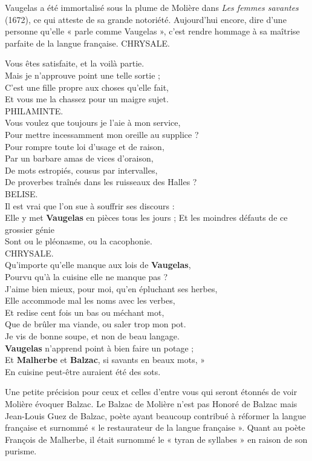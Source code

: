 \begin{bbcomplement}{}
Vaugelas a été immortalisé sous la plume de Molière dans \textit{Les femmes savantes} (1672), ce qui atteste de sa grande notoriété. Aujourd’hui encore, dire d’une personne qu’elle « parle comme Vaugelas », c’est rendre hommage à sa maîtrise parfaite de la langue française.
CHRYSALE.
\par
Vous êtes satisfaite, et la voilà partie.\\
Mais je n’approuve point une telle sortie ;\\
C’est une fille propre aux choses qu’elle fait,\\
Et vous me la chassez pour un maigre sujet.\\
PHILAMINTE.\\
Vous voulez que toujours je l’aie à mon service,\\
Pour mettre incessamment mon oreille au supplice ?\\
Pour rompre toute loi d’usage et de raison,\\
Par un barbare amas de vices d’oraison,\\
De mots estropiés, cousus par intervalles,\\
De proverbes traînés dans les ruisseaux des Halles ?\\
BELISE.\\
Il est vrai que l’on sue à souffrir ses discours :\\
Elle y met \textbf{Vaugelas} en pièces tous les jours ;
Et les moindres défauts de ce grossier génie\\
Sont ou le pléonasme, ou la cacophonie.\\
CHRYSALE.\\
Qu’importe qu’elle manque aux lois de \textbf{Vaugelas},\\
Pourvu qu’à la cuisine elle ne manque pas ?\\
J’aime bien mieux, pour moi, qu’en épluchant ses herbes,\\
Elle accommode mal les noms avec les verbes,\\
Et redise cent fois un bas ou méchant mot,\\
Que de brûler ma viande, ou saler trop mon pot.\\
Je vis de bonne soupe, et non de beau langage.\\
\textbf{Vaugelas} n’apprend point à bien faire un potage ;\\
Et \textbf{Malherbe} et \textbf{Balzac}, si savants en beaux mots, »\\
En cuisine peut-être auraient été des sots.

Une petite précision pour ceux et celles d’entre vous qui seront étonnés de voir Molière évoquer Balzac. Le Balzac de Molière n’est pas Honoré de Balzac mais Jean-Louis Guez de Balzac, poète ayant beaucoup contribué à réformer la langue française et surnommé « le restaurateur de la langue française ». Quant au poète François de Malherbe, il était surnommé le « tyran de syllabes » en raison de son purisme.
\end{bbcomplement}
